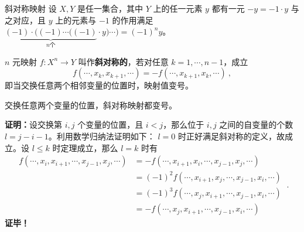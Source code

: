
\begin{issues}
\issueDraft
{}
\end{issues}


\begin{definition}{斜对称映射}\label{def_AntMap_1}
设 $X,Y$ 是任一集合，其中 $Y$ 上的任一元素 $y$ 都有一元 $-y=-1\cdot y$ 与之对应，且 $y$ 上的元素与 $-1$ 的作用满足 $\underbrace{(-1)\cdot((-1)\cdots((-1)}_{n\text{个}}\cdot y)\cdots)=(-1)^n y$。

 $n$ 元映射 $f:X^n\rightarrow Y$ 叫作\textbf{斜对称的}，若对任意 $k=1,\cdots,n-1$，成立
\begin{equation}\label{eq_AntMap_3}
f(\cdots,x_k,x_{k+1},\cdots)=-f(\cdots,x_{k+1},x_k,\cdots)~,
\end{equation}
即当交换任意两个相邻变量的位置时，映射值变号。
\end{definition}
\begin{theorem}{}\label{the_AntMap_1}
交换任意两个变量的位置，斜对称映射都变号。
\end{theorem}
\textbf{证明：}设交换第 $i,j$ 个变量的位置，且 $i<j$，那么位于 $i,j$ 之间的自变量的个数 $l=j-i-1$。利用数学归纳法证明如下： $l=0$ 时正好满足斜对称的定义，故成立。设 $l\leq k$ 时定理成立，那么 $l=k$ 时有
\begin{equation}
\begin{aligned}
f(\cdots,x_i,x_{i+1},\cdots,x_{j-1},x_j,\cdots)&=-f(\cdots,x_{i+1},x_{i},\cdots,x_{j-1},x_j,\cdots)\\
&=(-1)^2 f(\cdots,x_{i+1},x_{j},\cdots,x_{j-1},x_i,\cdots)\\
&=(-1)^3 f(\cdots,x_{j},x_{i+1},\cdots,x_{j-1},x_i,\cdots)\\
&=-f(\cdots,x_{j},x_{i+1},\cdots,x_{j-1},x_i,\cdots)
\end{aligned}~.
\end{equation}
\textbf{证毕！}

